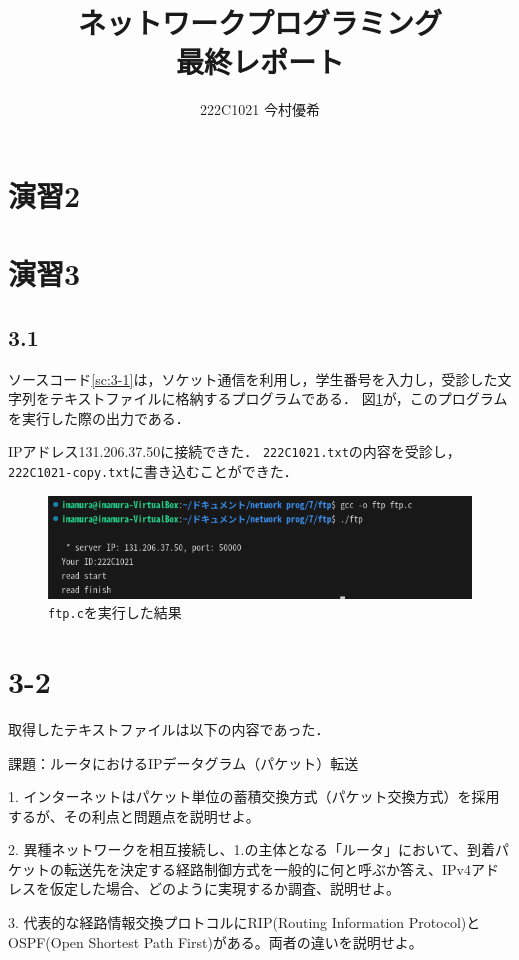 \documentclass[documentclass]{jsarticle}
\begin{document}
\title{ネットワークプログラミング\\ 最終レポート}
\author{222C1021 今村優希}
\maketitle

\newpage

\section*{演習2}

\newpage

\section*{演習3}
\subsection*{3.1}
ソースコード\ref*{sc:3-1}は，ソケット通信を利用し，学生番号を入力し，受診した文字列をテキストファイルに格納するプログラムである．
図\ref*{fig:3-1}が，このプログラムを実行した際の出力である．

IPアドレス131.206.37.50に接続できた．
\texttt{222C1021.txt}の内容を受診し，\texttt{222C1021-copy.txt}に書き込むことができた．


\begin{figure}[H]
  \begin{center}
    \includegraphics*[]{figure/3-1.png}
  \end{center}
  \caption[]{\texttt{ftp.c}を実行した結果}
  \label{fig:3-1}
\end{figure}

\section*{3-2}
取得したテキストファイルは以下の内容であった．
\begin{tcolorbox}
  課題：ルータにおけるIPデータグラム（パケット）転送

  1. インターネットはパケット単位の蓄積交換方式（パケット交換方式）を採用するが、その利点と問題点を説明せよ。
  
  2. 異種ネットワークを相互接続し、1.の主体となる「ルータ」において、到着パケットの転送先を決定する経路制御方式を一般的に何と呼ぶか答え、IPv4アドレスを仮定した場合、どのように実現するか調査、説明せよ。
  
  3. 代表的な経路情報交換プロトコルにRIP(Routing Information Protocol)とOSPF(Open Shortest Path First)がある。両者の違いを説明せよ。
\end{tcolorbox}
\end{document}
